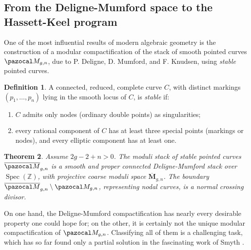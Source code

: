 \documentclass[11pt]{amsart}
\newcommand{\oM}{\overline{\pazocal M}}
\theoremstyle{plain}
\newtheorem{thm}{Theorem}[section]
\theoremstyle{definition}
\newtheorem{dfn}[thm]{Definition}
\begin{document}
\subsection{From the Deligne-Mumford space to the Hassett-Keel program} One of the most influential results of modern algebraic geometry is the construction of a modular compactification of the stack of smooth pointed curves $\pazocal M_{g,n}$, due to P. Deligne, D. Mumford, and F. Knudsen, using \emph{stable} pointed curves.

\begin{dfn}\cite{DM}
 A connected, reduced, complete curve $C$, with distinct markings $(p_1,\ldots,p_n)$ lying in the smooth locus of $C$, is \emph{stable} if:
 \begin{enumerate}[leftmargin=.7cm]
  \item $C$ admits only nodes (ordinary double points) as singularities;
  \item every rational component of $C$ has at least three special points (markings or nodes), and every elliptic component has at least one.
 \end{enumerate}
\end{dfn}

\begin{thm} \cite{DM,Knudsen}
 Assume $2g-2+n>0$. The moduli stack of stable pointed curves $\oM_{g,n}$ is a smooth and proper connected Deligne-Mumford stack over $\operatorname{Spec}(\mathbb Z)$, with projective coarse moduli space $\overline{\mathbf M}_{g,n}$. The boundary $\oM_{g,n}\setminus\pazocal M_{g,n}$, representing nodal curves, is a normal crossing divisor.
\end{thm}
On one hand, the Deligne-Mumford compactification has nearly every desirable property one could hope for; on the other, it is certainly not the unique modular compactification of $\pazocal M_{g,n}$. Classifying all of them is a challenging task, which has so far found only a partial solution in the fascinating work of Smyth \cite{SMY-towards}.%
\end{document}
